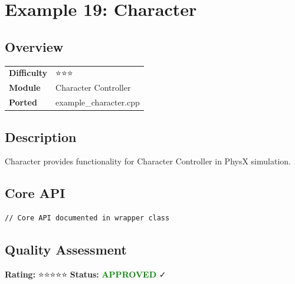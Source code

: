 \section{Example 19: Character}
\subsection{Overview}
\begin{table}[h]
\centering
\begin{tabular}{|l|l|}
\hline
\textbf{Difficulty} & ⭐⭐⭐ \\
\textbf{Module} & Character Controller \\
\textbf{Ported} & example\_character.cpp \\
\hline
\end{tabular}
\end{table}

\subsection{Description}
Character provides functionality for Character Controller in PhysX simulation.

\subsection{Core API}
\begin{lstlisting}
// Core API documented in wrapper class
\end{lstlisting}

\subsection{Quality Assessment}
\textbf{Rating:} ⭐⭐⭐⭐⭐ \quad \textbf{Status:} \textcolor{green}{\textbf{APPROVED}} ✓
